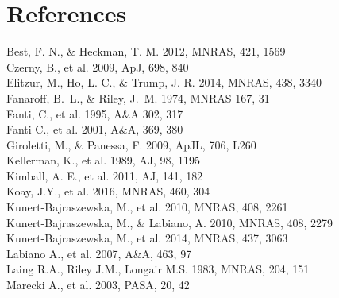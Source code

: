 \documentclass[utf8]{frontiersSCNS} %
\begin{document}
\section*{References}
\setlength{\parindent}{0cm}
Best, F. N., $\&$ Heckman, T. M.  2012, MNRAS, 421, 1569\\
Czerny, B., et al. 2009, ApJ, 698, 840\\
Elitzur, M., Ho, L. C., \& Trump, J. R. 2014, MNRAS, 438, 3340\\
Fanaroff, B.~L., \& Riley, J.~M. 1974, MNRAS 167, 31\\
Fanti, C., et al. 1995, A\&A 302, 317\\
Fanti  C., et al. 2001, A\&A, 369, 380\\
Giroletti, M., \& Panessa, F. 2009, ApJL, 706, L260\\
Kellerman, K., et al. 1989, AJ, 98, 1195\\
Kimball, A. E., et al. 2011, AJ, 141, 182\\
Koay, J.Y., et al. 2016, MNRAS, 460, 304\\ 
Kunert-Bajraszewska, M., et al. 2010, MNRAS, 408, 2261\\
Kunert-Bajraszewska, M., \& Labiano, A. 2010, MNRAS, 408, 2279\\
Kunert-Bajraszewska, M., et al. 2014, MNRAS, 437, 3063\\
Labiano A., et al. 2007, A$\&$A, 463, 97\\
Laing R.A., Riley J.M., Longair M.S. 1983, MNRAS, 204, 151\\
Marecki A., et al. 2003, PASA, 20, 42\\
\end{document}
